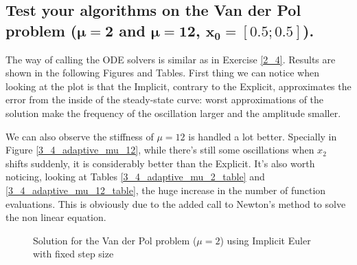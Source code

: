 
\subsection{Test your algorithms on the Van der Pol problem \texorpdfstring{($\mathbf{\mu = 2}$ and $\mathbf{\mu = 12}$, $\mathbf{x_0 = [0.5;0.5]}$).}{(mu = 2 and mu = 12, x0 = [0.5;0.5]).}}
The way of calling the ODE solvers is similar as in Exercise \ref{2_4}. Results are shown in the following Figures and Tables. First thing we can notice when looking at the plot is that the Implicit, contrary to the Explicit, approximates the error from the inside of the steady-state curve: worst approximations of the solution make the frequency of the oscillation larger and the amplitude smaller.

We can also observe the stiffness of $\mu=12$ is handled a lot better. Specially in Figure \ref{3_4_adaptive_mu_12}, while there's still some oscillations when $x_2$ shifts suddenly, it is considerably better than the Explicit. It's also worth noticing, looking at Tables \ref{3_4_adaptive_mu_2_table} and \ref{3_4_adaptive_mu_12_table}, the huge increase in the number of function evaluations. This is obviously due to the added call to Newton's method to solve the non linear equation.

\begin{figure}[H]
    \centering
    \caption{Solution for the Van der Pol problem ($\mathit{\mu = 2}$) using Implicit Euler with fixed step size}
    \label{3_4_fixed_mu_2}
\end{figure}

